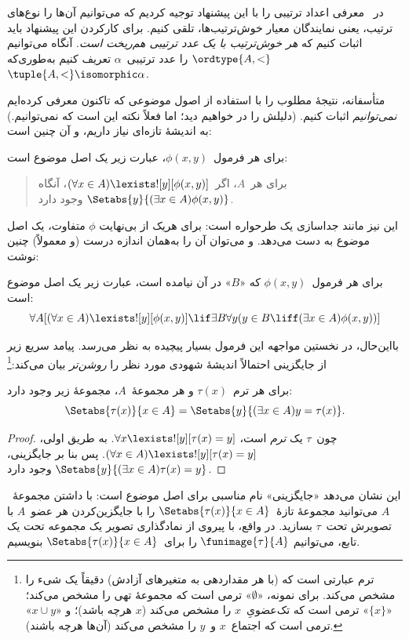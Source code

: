 \documentclass[../../../include/open-logic-section]{subfiles}
\begin{document}

در~ معرفی اعداد ترتیبی را با این پیشنهاد
توجیه کردیم که می‌توانیم آن‌ها را نوع‌های ترتیب، یعنی نمایندگان معیار
خوش‌ترتیب‌ها، تلقی کنیم. برای کارکردن این پیشنهاد باید اثبات کنیم که
\emph{هر خوش‌ترتیب با یک عدد ترتیبی هم‌ریخت است}. آنگاه می‌توانیم
$\ordtype{A,<}$ را عدد ترتیبی~$\alpha$ تعریف کنیم به‌طوری‌که
$\tuple{A,<} \isomorphic \alpha$.

متأسفانه، نتیجهٔ مطلوب را با استفاده از اصول موضوعی که تاکنون معرفی
کرده‌ایم \emph{نمی‌توانیم} اثبات کنیم. (دلیلش را در
 خواهیم دید؛ اما فعلاً نکته این است که
نمی‌توانیم.) به اندیشهٔ تازه‌ای نیاز داریم، و آن چنین است:

\begin{axiom}
برای هر فرمول~$\phi(x,y)$، عبارت زیر یک اصل موضوع است:
\begin{quote}
	برای هر~$A$، اگر~$(\forall x \in A)\lexists![y][\phi(x,y)]$، آنگاه
	$\Setabs{y}{(\exists x \in A)\phi(x,y)}$ وجود دارد.
\end{quote}
\end{axiom}
\noindent
این نیز مانند جداسازی یک طرحواره است: برای هریک از بی‌نهایت
$\phi$ متفاوت، یک اصل موضوع به دست می‌دهد. و می‌توان آن را به‌همان اندازه
درست (و معمولاً) چنین نوشت:

\begin{defish}
برای هر فرمول~$\phi(x,y)$ که «$B$» در آن نیامده است، عبارت زیر یک اصل
موضوع است:
\[
\forall A[(\forall x \in A)\lexists![y][\phi(x,y)] \lif \exists B\forall y (y \in B \liff (\exists x \in A)\phi(x,y))]
\]
\end{defish}

بااین‌حال، در نخستین مواجهه این فرمول بسیار پیچیده به نظر می‌رسد. پیامد
سریع زیر از جایگزینی احتمالاً اندیشهٔ شهودی مورد نظر را
\emph{روشن‌تر} بیان می‌کند:\footnote{ترم عبارتی است که (با هر مقداردهی
به متغیرهای آزادش) دقیقاً یک شیء را مشخص می‌کند. برای نمونه،
«$\emptyset$» ترمی است که مجموعهٔ تهی را مشخص می‌کند؛ «$\{x\}$» ترمی است
که تک‌عضویِ~$x$ را مشخص می‌کند ($x$ هرچه باشد)؛ و «$x \cup y$» ترمی است
که اجتماع~$x$ و~$y$ را مشخص می‌کند (آن‌ها هرچه باشند).}

\begin{cor}
برای هر ترم~$\tau(x)$ و هر مجموعهٔ~$A$، مجموعهٔ زیر وجود دارد:
\[
	\Setabs{\tau(x)}{x \in A} = \Setabs{y}{(\exists x \in A)y = \tau(x)}.
\]
\end{cor}

\begin{proof}
چون~$\tau$ یک \emph{ترم} است،
$\forall x \lexists![y][\tau(x)=y]$. به طریق اولی،
$(\forall x \in A)\lexists![y][\tau(x)=y]$. پس بنا بر جایگزینی،
$\Setabs{y}{(\exists x \in A)\tau(x)=y}$ وجود دارد.
\end{proof}
\noindent
این نشان می‌دهد «جایگزینی» نام مناسبی برای اصل موضوع است: با داشتن
مجموعهٔ~$A$ می‌توانید مجموعهٔ تازهٔ~$\Setabs{\tau(x)}{x \in A}$ را با
جایگزین‌کردن هر عضو~$A$ با تصویرش تحت~$\tau$ بسازید. در واقع، با پیروی از
نمادگذاری تصویر یک مجموعه تحت یک تابع، می‌توانیم
$\funimage{\tau}{A}$ را برای~$\Setabs{\tau(x)}{x \in A}$ بنویسیم.
\end{document}
